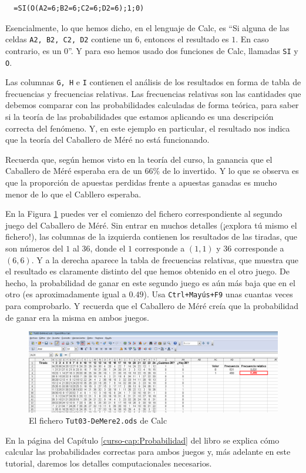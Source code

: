 \documentclass[10pt,a4paper]{article}\usepackage[]{graphicx}\usepackage[]{color}
\newcounter {cont01}
\begin{document}
\begin{verbatim}
  =SI(O(A2=6;B2=6;C2=6;D2=6);1;0)
\end{verbatim}
Esencialmente, lo que hemos dicho, en el lenguaje de Calc, es ``Si alguna de las celdas {\tt A2, B2, C2, D2} contiene un 6, entonces el resultado es $1$. En caso contrario, es un $0$''. Y para eso hemos usado dos funciones de Calc, llamadas {\tt SI} y {\tt O}.

Las columnas {\tt G, H} e {\tt I} contienen el análisis de los resultados en forma de tabla de frecuencias y frecuencias relativas. Las frecuencias relativas son las cantidades que debemos comparar con las probabilidades calculadas de forma teórica, para saber si la teoría de las probabilidades que estamos aplicando es una descripción correcta del fenómeno. Y, en este ejemplo en particular, el resultado nos indica que la teoría del Caballero de Méré no está funcionando.

Recuerda que, según hemos visto en la teoría del curso, la ganancia que el Caballero de Méré esperaba era de un 66\% de lo invertido. Y lo que se observa es que la proporción de apuestas perdidas frente a apuestas ganadas es mucho menor de lo que el Cabllero esperaba.

En la Figura \ref{tut03:fig:Tut03-DeMere2.ods} puedes ver el comienzo del fichero correspondiente al segundo juego del Caballero de Méré. Sin entrar en muchos detalles (¡explora tú mismo el fichero!), las columnas de la izquierda contienen los resultados de las tiradas, que son números del $1$ al $36$, donde el $1$ corresponde a $(1,1)$ y $36$ corresponde a $(6,6)$. Y a la derecha aparece la tabla de frecuencias relativas, que muestra que el resultado es claramente distinto del que hemos obtenido en el otro juego. De hecho, la probabilidad de ganar en este segundo juego es aún más baja que en el otro (es aproximadamente igual a $0.49$). Usa {\tt Ctrl+Mayús+F9} unas cuantas veces para comprobarlo. Y recuerda que el Caballero de Méré creía que la probabilidad de ganar era la misma en ambos juegos.
\begin{figure}[h!]
    \begin{center}
    \includegraphics[width=15cm]{../fig/Tut03-42.png}
    \end{center}
  \caption{El fichero {\tt Tut03-DeMere2.ods} de Calc}
  \label{tut03:fig:Tut03-DeMere2.ods}
\end{figure}
En la página \pageref{curso-cap03:subsubsec:JuegosDeMereCombinatoria} del Capítulo \ref{curso-cap:Probabilidad} del libro se explica cómo calcular las probabilidades correctas para ambos juegos y, más adelante en este tutorial, daremos los detalles computacionales necesarios.
\end{document}
